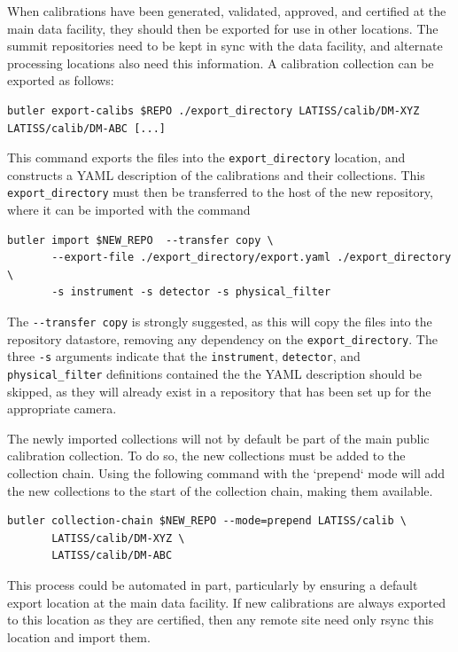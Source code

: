 \documentclass[DM,authoryear,toc]{lsstdoc}
\begin{document}
When calibrations have been generated, validated, approved, and certified at the main data facility, they should then be exported for use in other locations.  The summit repositories need to be kept in sync with the data facility, and alternate processing locations also need this information.  A calibration collection can be exported as follows:

\begin{verbatim}
butler export-calibs $REPO ./export_directory LATISS/calib/DM-XYZ LATISS/calib/DM-ABC [...]
\end{verbatim}

This command exports the files into the \verb|export_directory| location, and constructs a YAML description of the calibrations and their collections.  This \verb|export_directory| must then be transferred to the host of the new repository, where it can be imported with the command

\begin{verbatim}
butler import $NEW_REPO  --transfer copy \
       --export-file ./export_directory/export.yaml ./export_directory \
       -s instrument -s detector -s physical_filter
\end{verbatim}

The \verb|--transfer copy| is strongly suggested, as this will copy the files into the repository datastore, removing any dependency on the \verb|export_directory|.  The three \verb|-s| arguments indicate that the \verb|instrument|, \verb|detector|, and \verb|physical_filter| definitions contained the the YAML description should be skipped, as they will already exist in a repository that has been set up for the appropriate camera.

The newly imported collections will not by default be part of the main public calibration collection.  To do so, the new collections must be added to the collection chain.  Using the following command with the `prepend` mode will add the new collections to the start of the collection chain, making them available.

\begin{verbatim}
butler collection-chain $NEW_REPO --mode=prepend LATISS/calib \
       LATISS/calib/DM-XYZ \
       LATISS/calib/DM-ABC
\end{verbatim}

This process could be automated in part, particularly by ensuring a default export location at the main data facility.  If new calibrations are always exported to this location as they are certified, then any remote site need only rsync this location and import them.
\end{document}
